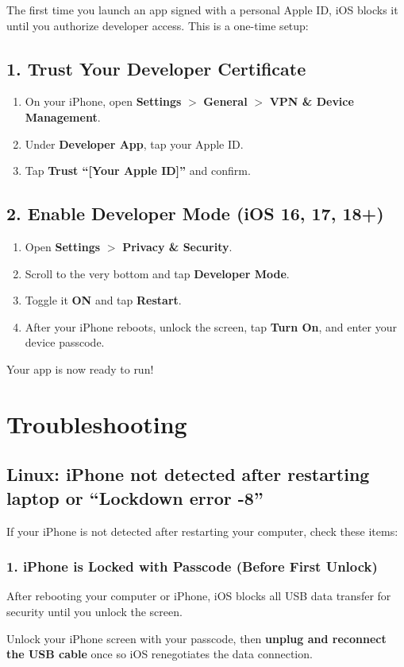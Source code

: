 \documentclass[11pt,a4paper]{article}
\begin{document}
The first time you launch an app signed with a personal Apple ID, iOS blocks it until you authorize developer access. This is a one-time setup:

\subsection*{1. Trust Your Developer Certificate}
\begin{enumerate}
    \item On your iPhone, open \textbf{Settings} $>$ \textbf{General} $>$ \textbf{VPN \& Device Management}.
    \item Under \textbf{Developer App}, tap your Apple ID.
    \item Tap \textbf{Trust ``[Your Apple ID]''} and confirm.
\end{enumerate}

\subsection*{2. Enable Developer Mode (iOS 16, 17, 18+)}
\begin{enumerate}
    \item Open \textbf{Settings} $>$ \textbf{Privacy \& Security}.
    \item Scroll to the very bottom and tap \textbf{Developer Mode}.
    \item Toggle it \textbf{ON} and tap \textbf{Restart}.
    \item After your iPhone reboots, unlock the screen, tap \textbf{Turn On}, and enter your device passcode.
\end{enumerate}

Your app is now ready to run!

{}
\section*{Troubleshooting}

\subsection*{Linux: iPhone not detected after restarting laptop or ``Lockdown error -8''}

If your iPhone is not detected after restarting your computer, check these items:

\subsubsection*{1. iPhone is Locked with Passcode (Before First Unlock)}
After rebooting your computer or iPhone, iOS blocks all USB data transfer for security until you unlock the screen.
\begin{notebox}[Rule]
Unlock your iPhone screen with your passcode, then \textbf{unplug and reconnect the USB cable} once so iOS renegotiates the data connection.
\end{notebox}
\end{document}
